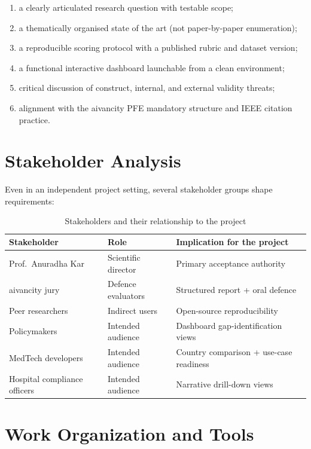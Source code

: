 \begin{enumerate}[noitemsep]
  \item a clearly articulated research question with testable scope;
  \item a thematically organised state of the art (not paper-by-paper enumeration);
  \item a reproducible scoring protocol with a published rubric and dataset version;
  \item a functional interactive dashboard launchable from a clean environment;
  \item critical discussion of construct, internal, and external validity threats;
  \item alignment with the aivancity PFE mandatory structure and IEEE citation
        practice.
\end{enumerate}

\section{Stakeholder Analysis}
\label{sec:stakeholders-context}

Even in an independent project setting, several stakeholder groups shape requirements:

\begin{table}[htbp]
\centering
\caption{Stakeholders and their relationship to the project}
\label{tab:stakeholders-ctx}
\begin{tabular}{@{}p{3.0cm}p{3.2cm}p{4.8cm}@{}}
\toprule
\textbf{Stakeholder} & \textbf{Role} & \textbf{Implication for the project} \\
\midrule
Prof.\ Anuradha Kar & Scientific director & Primary acceptance authority \\
aivancity jury & Defence evaluators & Structured report + oral defence \\
Peer researchers & Indirect users & Open-source reproducibility \\
Policymakers & Intended audience & Dashboard gap-identification views \\
MedTech developers & Intended audience & Country comparison + use-case readiness \\
Hospital compliance officers & Intended audience & Narrative drill-down views \\
\bottomrule
\end{tabular}
\end{table}

\section{Work Organization and Tools}
\label{sec:workorg}

